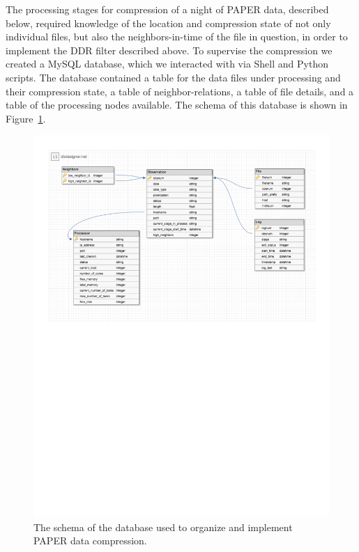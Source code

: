The processing stages for compression of a night of PAPER data, described below, required knowledge of the location and compression state of not only individual files, but also the neighbors-in-time of the file in question, in order to implement the DDR filter described above. To supervise the compression we created a MySQL database, which we interacted with via Shell and Python scripts. The database contained a table for the data files under processing and their compression state, a table of neighbor-relations, a table of file details, and a table of the processing nodes available. The schema of this database is shown in Figure~\ref{fig:database_schema}.

\begin{figure}[h]
\centering
\includegraphics[scale=0.7]{chapters/data_processing/figures/RTP_diagram.pdf}
\caption[The schema of the database used to organize and implement PAPER data compression.]{The schema of the database used to organize and implement PAPER data compression.}
\label{fig:database_schema}
\end{figure}

